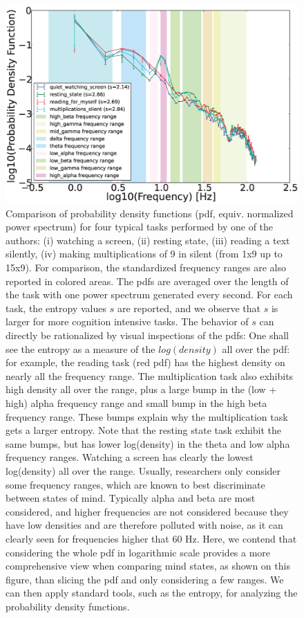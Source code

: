 \begin{figure}[!t]
\centering
\includegraphics[width=1.1\columnwidth]{../figures/compareArtifacts.eps}
\caption{Comparison of probability density functions (pdf, equiv. normalized power spectrum) for four typical tasks performed by one of the authors: (i) watching a screen, (ii) resting state, (iii) reading a text silently, (iv) making multiplications of 9 in silent (from 1x9 up to 15x9). For comparison, the standardized frequency ranges are also reported in colored areas. The pdfs are averaged over the length of the task with one power spectrum generated every second. For each task, the entropy values $s$ are reported, and we observe that $s$ is larger for more cognition intensive tasks. The behavior of $s$ can directly be rationalized by visual inspections  of the pdfs: One shall see the entropy as a measure of the $log(density)$ all over the pdf: for example, the reading task (red pdf) has the highest density on nearly all the frequency range. The multiplication task also exhibits high density all over the range, plus a large bump in the  (low + high) alpha frequency range and small bump in the high beta frequency range. These bumps explain why the multiplication task gets a larger entropy. Note that the resting state task exhibit the same bumps, but has lower log(density) in the theta and low alpha frequency ranges. Watching a screen has clearly the lowest log(density) all over the range. Usually, researchers only consider some frequency ranges, which are known to best discriminate between states of mind. Typically alpha and beta are most considered, and higher frequencies are not considered because they have low densities and are therefore polluted with noise, as it can clearly seen for frequencies higher that 60 Hz. Here, we contend that considering the whole pdf in logarithmic scale provides a more comprehensive view when comparing mind states, as shown on this figure, than slicing the pdf and only considering a few ranges. We can then apply standard tools, such as the entropy, for analyzing the probability density functions.}
\label{fig:pspectrum}
\end{figure}


